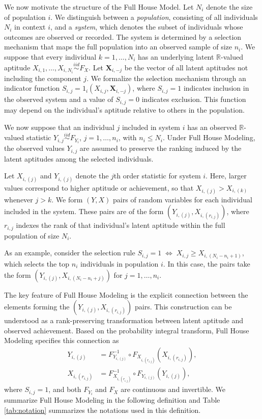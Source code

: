\documentclass[12pt]{article}
\newcommand{\R}{\mathbb{R}}
\begin{document}
We now motivate the structure of the Full House Model.  Let $N_i$ denote the size of population $i$. We distinguish between a \emph{population}, consisting of all individuals $N_i$ in context $i$, and a \emph{system}, which denotes the subset of individuals whose outcomes are observed or recorded. The system is determined by a selection mechanism that maps the full population into an observed sample of size $n_i$. We suppose that every individual $k = 1,\ldots, N_i$ has an underlying latent $\R$-valued aptitude $X_{i,1}, \ldots, X_{i,N_i} \overset{iid}{\sim} F_{X}$. Let $\textbf{X}_{i,-j}$ be the vector of all latent aptitudes not including the component $j$. We formalize the selection mechanism through an indicator function $S_{i,j} = 1_{i}\left(X_{i,j},\textbf{X}_{i,-j}\right)$, where $S_{i,j} = 1$ indicates inclusion in the observed system and a value of $S_{i,j} = 0$ indicates exclusion. This function may depend on the individual's aptitude relative to others in the population.

We now suppose that an individual $j$ included in system $i$ has an observed $\R$-valued statistic $Y_{i,j} \overset{iid}{\sim} F_{Y_i}$, $j = 1,\ldots,n_i$, with $n_i \leq N_i$. Under Full House Modeling, the observed values $Y_{i,j}$ are assumed to preserve the ranking induced by the latent aptitudes among the selected individuals.

Let $X_{i,(j)}$ and $Y_{i,(j)}$ denote the $j$th order statistic for system $i$. Here, larger values correspond to higher aptitude or achievement, so that $X_{i,(j)} > X_{i,(k)}$ whenever $j>k$. We form $(Y,X)$ pairs of random variables for each individual included in the system. These pairs are of the form $(Y_{i,(j)}, X_{i,(r_{i,j})})$, where $r_{i,j}$ indexes the rank of that individual's latent aptitude within the full population of size $N_i$. 

As an example, consider the selection rule $S_{i,j} = 1 \;\Longleftrightarrow\; X_{i,j} \ge X_{i,(N_i-n_i+1)}$, which selects the top $n_i$ individuals in population $i$. In this case, the pairs take the form $(Y_{i,(j)}, X_{i,(N_i - n_i + j)})$ for $j = 1,\ldots,n_i$.

The key feature of Full House Modeling is the explicit connection between the elements forming the $(Y_{i,(j)}, X_{i,(r_{i,j})})$ pairs. This construction can be understood as a rank-preserving transformation between latent aptitude and observed achievement. Based on the probability integral transform, Full House Modeling specifies this connection as
\begin{equation} \label{eq:truepar}
\begin{split}
  Y_{i, (j)} &= F_{Y_{i, (j)}}^{-1} \circ F_{X_{i, (r_{i,j})}} \left(X_{i, (r_{i,j})}\right), \\
  X_{i, (r_{i,j})} &= F_{X_{i, (r_{i,j})}}^{-1} \circ F_{Y_{i,(j)}} \left(Y_{i,(j)} \right),
\end{split}
\end{equation}
where $S_{i,j} = 1$, and both $F_{Y_i}$ and $F_X$ are continuous and invertible. We summarize Full House Modeling in the following definition and Table \ref{tab:notation} summarizes the notations used in this definition.
\end{document}
